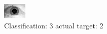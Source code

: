 \begin{figure}[h!]
\begin{center}
\includegraphics[width=0.60\columnwidth]{figures/ID1655_class_3_target_2.png}
\end{center}
\caption{ Classification: 3 actual target: 2}
\label{fig:ID1655_class_3_target_2}
\end{figure}
